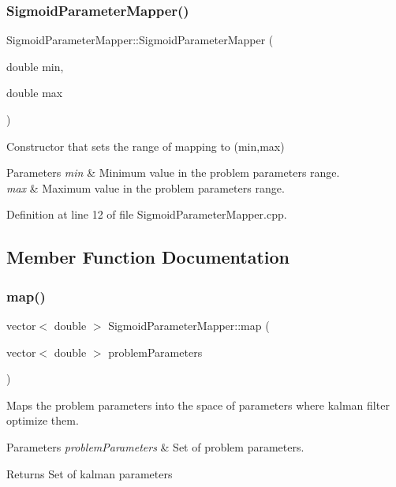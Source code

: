 \subsubsection{\texorpdfstring{Sigmoid\+Parameter\+Mapper()}{SigmoidParameterMapper()}}
{\footnotesize\ttfamily Sigmoid\+Parameter\+Mapper\+::\+Sigmoid\+Parameter\+Mapper (\begin{DoxyParamCaption}\item[{double}]{min,  }\item[{double}]{max }\end{DoxyParamCaption})}

Constructor that sets the range of mapping to (min,max) 
\begin{DoxyParams}{Parameters}
{\em min} & Minimum value in the problem parameters range. \\
\hline
{\em max} & Maximum value in the problem parameters range. \\
\hline
\end{DoxyParams}


Definition at line 12 of file Sigmoid\+Parameter\+Mapper.\+cpp.



\subsection{Member Function Documentation}
\mbox{\label{classSigmoidParameterMapper_a808db49587ff6c2d2c2b2efc84de80f6}} 
\subsubsection{\texorpdfstring{map()}{map()}}
{\footnotesize\ttfamily vector$<$ double $>$ Sigmoid\+Parameter\+Mapper\+::map (\begin{DoxyParamCaption}\item[{vector$<$ double $>$}]{problem\+Parameters }\end{DoxyParamCaption})\hspace{0.3cm}{\ttfamily [virtual]}}

Maps the problem parameters into the space of parameters where kalman filter optimize them. 
\begin{DoxyParams}{Parameters}
{\em problem\+Parameters} & Set of problem parameters. \\
\hline
\end{DoxyParams}
\begin{DoxyReturn}{Returns}
Set of kalman parameters 
\end{DoxyReturn}


